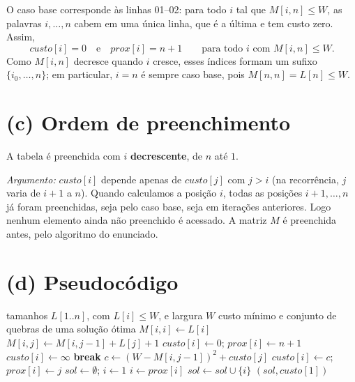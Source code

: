 \documentclass[11pt,a4paper]{article}
\begin{document}
O caso base corresponde às linhas 01--02: para todo $i$ tal que $M[i,n] \le W$, as
palavras $i,\dots,n$ cabem em uma única linha, que é a última e tem custo zero.
Assim,
\[
\mathit{custo}[i] = 0 \quad\text{e}\quad \mathit{prox}[i] = n+1
\qquad \text{para todo } i \text{ com } M[i,n]\le W.
\]
Como $M[i,n]$ decresce quando $i$ cresce, esses índices formam um sufixo
$\{i_0,\dots,n\}$; em particular, $i=n$ é sempre caso base, pois $M[n,n]=L[n]\le W$.

\section*{(c) Ordem de preenchimento}

A tabela é preenchida com $i$ \textbf{decrescente}, de $n$ até $1$.

\emph{Argumento:} $\mathit{custo}[i]$ depende apenas de $\mathit{custo}[j]$ com
$j > i$ (na recorrência, $j$ varia de $i+1$ a $n$). Quando calculamos a posição $i$,
todas as posições $i+1,\dots,n$ já foram preenchidas, seja pelo caso base, seja
em iterações anteriores. Logo nenhum elemento ainda não preenchido é acessado.
A matriz $M$ é preenchida antes, pelo algoritmo do enunciado.

\section*{(d) Pseudocódigo}

\begin{algorithm}[H]
\caption{\textsc{Impressão-Nítida-PD}$(L, n, W)$}
\begin{algorithmic}[1]
\Require tamanhos $L[1..n]$, com $L[i]\le W$, e largura $W$
\Ensure custo mínimo e conjunto de quebras de uma solução ótima
 
  \State $M[i,i] \gets L[i]$
    \State $M[i,j] \gets M[i,j-1] + L[j] + 1$
  \EndFor
\EndFor
{} 
   
    \State $\mathit{custo}[i] \gets 0$; \quad $\mathit{prox}[i] \gets n+1$
  \Else
    \State $\mathit{custo}[i] \gets \infty$
       \textbf{break} \EndIf
      \State $c \gets (W - M[i,j-1])^2 + \mathit{custo}[j]$
        \State $\mathit{custo}[i] \gets c$; \quad $\mathit{prox}[i] \gets j$
      \EndIf
    \EndFor
  \EndIf
\EndFor
\State $\mathit{sol} \gets \emptyset$; \quad $i \gets 1$ 
  \State $i \gets \mathit{prox}[i]$
  \State $\mathit{sol} \gets \mathit{sol} \cup \{i\}$
\EndWhile
\State \Return $(\mathit{sol}, \mathit{custo}[1])$
\end{algorithmic}
\end{algorithm}
\end{document}
